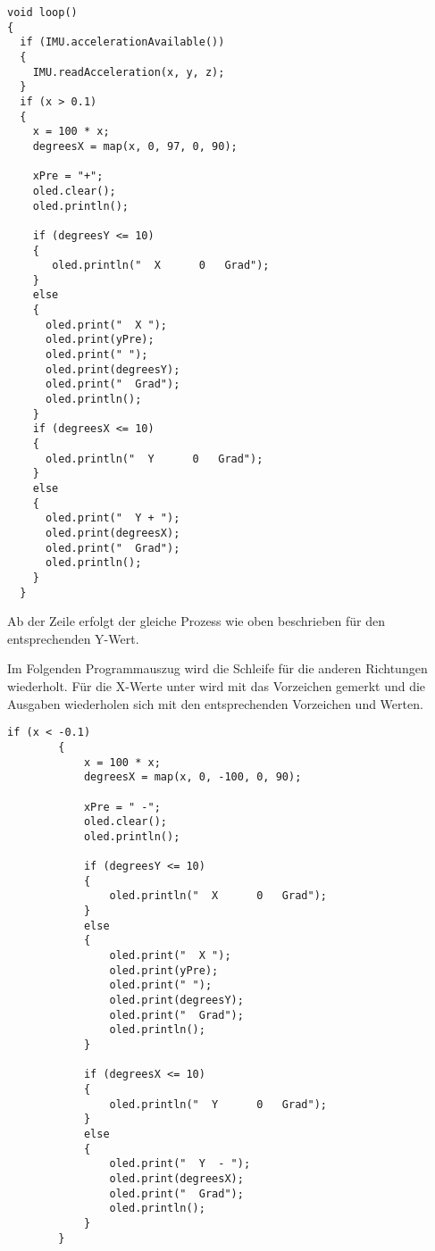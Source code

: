 \begin{lstlisting}[language=Arduino]
void loop() 
{
  if (IMU.accelerationAvailable()) 
  {
    IMU.readAcceleration(x, y, z);
  }
  if (x > 0.1) 
  {
    x = 100 * x;
    degreesX = map(x, 0, 97, 0, 90);
            
    xPre = "+";
    oled.clear();
    oled.println();
            
    if (degreesY <= 10) 
    {
       oled.println("  X      0   Grad");
    } 
    else 
    {
      oled.print("  X ");
      oled.print(yPre);
      oled.print(" ");
      oled.print(degreesY);
      oled.print("  Grad");
      oled.println();
    }
    if (degreesX <= 10) 
    {
      oled.println("  Y      0   Grad");
    } 
    else 
    {
      oled.print("  Y + ");
      oled.print(degreesX);
      oled.print("  Grad");
      oled.println();
    }
  }      
\end{lstlisting}
    
Ab der Zeile  erfolgt der gleiche Prozess wie oben beschrieben für den entsprechenden Y-Wert.
        
Im Folgenden Programmauszug wird die Schleife für die anderen Richtungen wiederholt. Für die X-Werte unter  wird mit  das Vorzeichen gemerkt und die Ausgaben wiederholen sich mit den entsprechenden Vorzeichen und Werten.
    
    \begin{lstlisting}[language=Arduino]
        if (x < -0.1) 
        {
            x = 100 * x;
            degreesX = map(x, 0, -100, 0, 90);
            
            xPre = " -";
            oled.clear();
            oled.println();
            
            if (degreesY <= 10) 
            {
                oled.println("  X      0   Grad");
            } 
            else 
            {
                oled.print("  X ");
                oled.print(yPre);
                oled.print(" ");
                oled.print(degreesY);
                oled.print("  Grad");
                oled.println();
            }
            
            if (degreesX <= 10) 
            {
                oled.println("  Y      0   Grad");
            } 
            else 
            {
                oled.print("  Y  - ");
                oled.print(degreesX);
                oled.print("  Grad");
                oled.println();
            }
        }
        
    \end{lstlisting}
    
